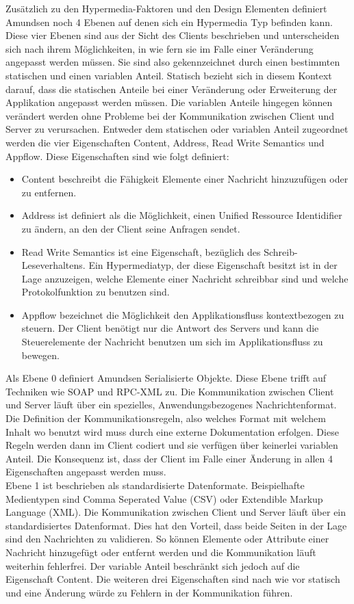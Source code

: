 Zusätzlich zu den Hypermedia-Faktoren und den Design Elementen definiert Amundsen noch 4 Ebenen auf denen sich ein Hypermedia Typ befinden kann. Diese vier Ebenen sind aus der Sicht des Clients beschrieben und unterscheiden sich nach ihrem Möglichkeiten, in wie fern sie im Falle einer Veränderung angepasst werden müssen. Sie sind also gekennzeichnet durch einen bestimmten statischen und einen variablen Anteil. Statisch bezieht sich in diesem Kontext darauf, dass die statischen Anteile bei einer Veränderung oder Erweiterung der Applikation angepasst werden müssen. Die variablen Anteile hingegen können verändert werden ohne Probleme bei der Kommunikation zwischen Client und Server zu verursachen. Entweder dem statischen oder variablen Anteil zugeordnet werden die vier Eigenschaften Content, Address, Read Write Semantics und Appflow. Diese Eigenschaften sind wie folgt definiert:
\begin{itemize}
\item Content beschreibt die Fähigkeit Elemente einer Nachricht hinzuzufügen oder zu entfernen.
\item Address ist definiert als die Möglichkeit, einen Unified Ressource Identidifier zu ändern, an den der Client seine Anfragen sendet.
\item Read Write Semantics ist eine Eigenschaft, bezüglich des Schreib-Leseverhaltens. Ein Hypermediatyp, der diese Eigenschaft besitzt ist in der Lage anzuzeigen, welche Elemente einer Nachricht schreibbar sind und welche Protokolfunktion zu benutzen sind.
\item Appflow bezeichnet die Möglichkeit den Applikationsfluss kontextbezogen zu steuern. Der Client benötigt nur die Antwort des Servers und kann die Steuerelemente der Nachricht benutzen um sich im Applikationsfluss zu bewegen.
\end{itemize}
Als Ebene 0 definiert Amundsen Serialisierte Objekte. Diese Ebene trifft auf Techniken wie SOAP und RPC-XML zu. Die Kommunikation zwischen Client und Server läuft über ein spezielles, Anwendungsbezogenes Nachrichtenformat. Die Definition der Kommunikationsregeln, also welches Format mit welchem Inhalt wo benutzt wird muss durch eine externe Dokumentation erfolgen. Diese Regeln werden dann im Client codiert und sie verfügen über keinerlei variablen Anteil. Die Konsequenz ist, dass der Client im Falle einer Änderung in allen 4 Eigenschaften angepasst werden muss.\\
Ebene 1 ist beschrieben als standardisierte Datenformate. Beispielhafte Medientypen sind Comma Seperated Value (CSV) oder Extendible Markup Language (XML). Die Kommunikation zwischen Client und Server läuft über ein standardisiertes Datenformat. Dies hat den Vorteil, dass beide Seiten in der Lage sind den Nachrichten zu validieren. So können Elemente oder Attribute einer Nachricht hinzugefügt oder entfernt werden und die Kommunikation läuft weiterhin fehlerfrei. Der variable Anteil beschränkt sich jedoch auf die Eigenschaft Content. Die weiteren drei Eigenschaften sind nach wie vor statisch und eine Änderung würde zu Fehlern in der Kommunikation führen.\\
